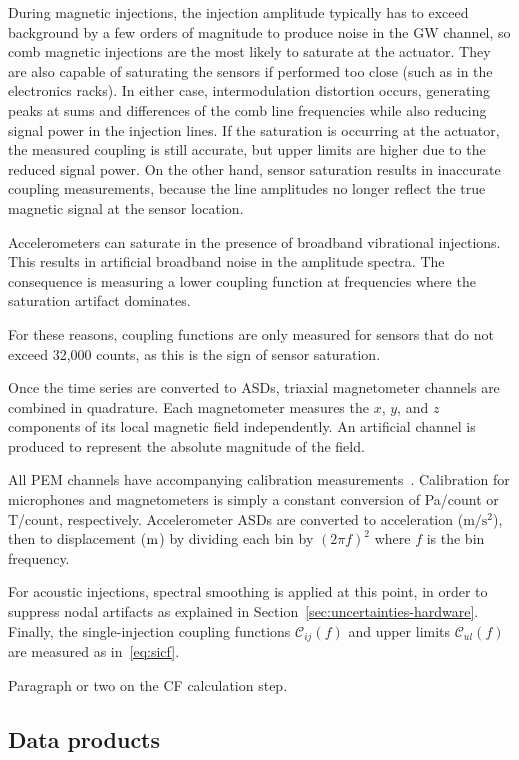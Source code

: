 During magnetic injections, the injection amplitude typically has to exceed background by a few orders of magnitude to produce noise in the \ac{GW} channel, so comb magnetic injections are the most likely to saturate at the actuator.
They are also capable of saturating the sensors if performed too close (such as in the electronics racks).
In either case, intermodulation distortion occurs, generating peaks at sums and differences of the comb line frequencies while also reducing signal power in the injection lines.
If the saturation is occurring at the actuator, the measured coupling is still accurate, but upper limits are higher due to the reduced signal power.
On the other hand, sensor saturation results in inaccurate coupling measurements, because the line amplitudes no longer reflect the true magnetic signal at the sensor location.

Accelerometers can saturate in the presence of broadband vibrational injections.
This results in artificial broadband noise in the amplitude spectra.
The consequence is measuring a lower coupling function at frequencies where the saturation artifact dominates.

For these reasons, coupling functions are only measured for sensors that do not exceed 32,000 counts, as this is the sign of sensor saturation.

Once the time series are converted to \acp{ASD}, triaxial magnetometer channels are combined in quadrature.
Each magnetometer measures the $x$, $y$, and $z$ components of its local magnetic field independently.
An artificial channel is produced to represent the absolute magnitude of the field.

All \ac{PEM} channels have accompanying calibration measurements~\citep{PEM_website}. Calibration for microphones and magnetometers is simply a constant conversion of Pa/count or T/count, respectively.
Accelerometer \acp{ASD} are converted to acceleration ($\mathrm{m/s^2}$), then to displacement ($\meter$) by dividing each bin by $(2\pi f)^2$ where $f$ is the bin frequency.

For acoustic injections, spectral smoothing is applied at this point, in order to suppress nodal artifacts as explained in Section~\ref{sec:uncertainties-hardware}.
Finally, the single-injection coupling functions $\mathcal{C}_{ij}(f)$ and upper limits $\mathcal{C}_{ul}(f)$ are measured as in~\cref{eq:sicf}.

{\color{red}
Paragraph or two on the CF calculation step.}

\subsection{Data products}

